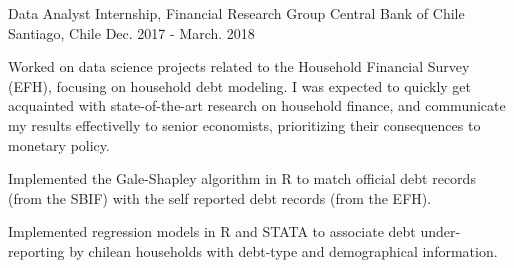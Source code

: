 \begin{cventries}
  \cventry
    {Data Analyst Internship, Financial Research Group} %
    {Central Bank of Chile} %
    {Santiago, Chile} %
    {Dec. 2017 - March. 2018} %
    {
      \begin{cvitems} %
        \item {Worked on data science projects related to the Household Financial Survey (EFH), focusing on household debt modeling. I was expected to
        quickly get acquainted with state-of-the-art research on household finance, and communicate my results effectivelly to senior economists, prioritizing their consequences to monetary policy.}
        \item {Implemented the Gale-Shapley algorithm in R to match official debt records (from the SBIF) with the self reported debt records (from the EFH).}
        \item {Implemented regression models in R and STATA to associate debt under-reporting by chilean households with debt-type and demographical information.}
      \end{cvitems}
    }
\end{cventries}
